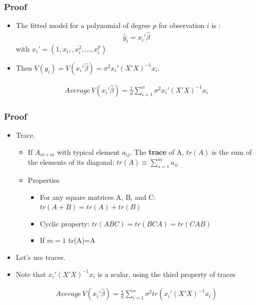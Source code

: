 \documentclass[
  shownotes,
  xcolor={svgnames},
  hyperref={colorlinks,citecolor=DarkBlue,linkcolor=DarkRed,urlcolor=DarkBlue}
  , aspectratio=169]{beamer}
\newenvironment{Shaded}{\begin{snugshade}}{\end{snugshade}}
\begin{document}
\begin{frame}[fragile]
\frametitle{Proof}

\begin{itemize}


\item The fitted model for a polynomial of degree $p$ for observation $i$ is :
\medskip
\begin{align}
\hat y_i = x_i'\hat\beta  
\end{align}
with  $x_i'=(1,x_i,,x_i^2,\dots,x_i^p)$
\medskip
\item Then $V(y_i) = V(x_i'\hat\beta)= \sigma^2 x_i'(X'X)^{-1}x_i$. 
\medskip


\begin{align}
Average\, V(x_i'\hat \beta)=\frac{1}{n}\sum_{i=1}^n \sigma^2 x_i'(X'X)^{-1}x_i
\end{align}
\end{itemize}
\end{frame}
\begin{frame}[fragile]
\frametitle{Proof}

\begin{small}
\begin{Shaded}
\begin{itemize}
  \item Trace.
  \begin{itemize}
    \tiny
  \item If $A_{m\times m}$ with typical element $a_{ij}$. The {\bf trace} of A, $tr(A)$ is the sum of the elements of its diagonal: $tr(A)\equiv \sum_{s=1}^m a_{ii}$
  \item Properties
  \begin{itemize}
    \tiny
    \item For any square matrices A, B, and C: $tr(A+B)=tr(A)+tr(B)$
    \item Cyclic property: $tr(ABC)=tr(BCA)=tr(CAB)$
    \item If $m=1$ tr(A)=A
  \end{itemize}
  \end{itemize}
\end{itemize}
\end{Shaded}
\end{small}
\begin{itemize}
\item Let's use traces. 
\medskip
\item Note that $x_i'(X'X)^{-1}x_i$ is a scalar, using the third property of traces

\begin{align}
Average\,V(x_i'\hat \beta)=\frac{1}{n}\sum_{i=1}^n \sigma^2 tr(x_i'(X'X)^{-1}x_i)
\end{align}
\end{itemize}


\end{frame}
\end{document}

